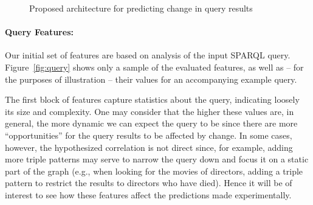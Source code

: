 \documentclass[runningheads]{llncs}
\begin{document}
\begin{figure}[tb]
{
}

\caption{Proposed architecture for predicting change in query results\label{fig:schema}}
\end{figure}

\paragraph{Query Features:} Our initial set of features are based on analysis of the input SPARQL query. Figure~\ref{fig:query} shows only a sample of the evaluated features, as well as -- for the purposes of illustration -- their values for an accompanying example query. 

The first block of features capture statistics about the query, indicating loosely its size and complexity. One may consider that the higher these values are, in general, the more dynamic we can expect the query to be since there are more ``opportunities'' for the query results to be affected by change. In some cases, however, the hypothesized correlation is not direct since, for example, adding more triple patterns may serve to narrow the query down and focus it on a static part of the graph (e.g., when looking for the movies of directors, adding a triple pattern to restrict the results to directors who have died). Hence it will be of interest to see how these features affect the predictions made experimentally.
\end{document}
